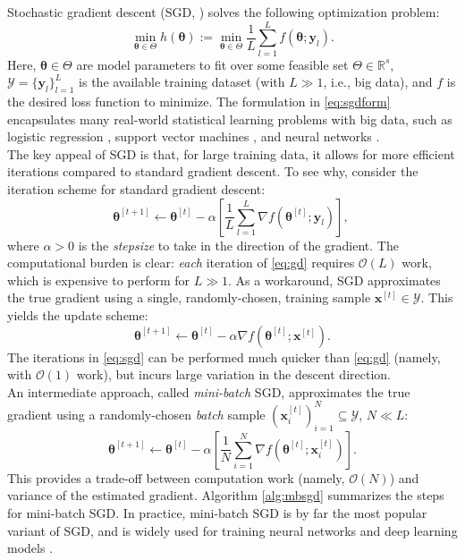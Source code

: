 \documentclass[12pt]{article}
\newcommand{\bm}[1]{\mathbf{#1}}
\begin{document}
Stochastic gradient descent (SGD, \citealp{Bot2010}) solves the following optimization problem:
\begin{equation}
\min_{\boldsymbol{\theta} \in \Theta} h(\boldsymbol{\theta}) := \min_{\boldsymbol{\theta} \in \Theta} \frac{1}{L} \sum_{l=1}^L f(\boldsymbol{\theta}; \bm{y}_l).
\label{eq:sgdform}
\end{equation}
Here, $\boldsymbol{\theta} \in \Theta$ are model parameters to fit over some feasible set $\Theta \in \mathbb{R}^s$, $\mathcal{Y} = \{\bm{y}_l\}_{l=1}^L$ is the available training dataset (with $L \gg 1$, i.e., big data), and $f$ is the desired loss function to minimize. The formulation in \eqref{eq:sgdform} encapsulates many real-world statistical learning problems with big data, such as logistic regression \citep{Bac2014}, support vector machines \citep{Tan2013}, and neural networks \citep{Sea2014}.\\

The key appeal of SGD is that, for large training data, it allows for more efficient iterations compared to standard gradient descent. To see why, consider the iteration scheme for standard gradient descent:
\begin{equation}
\boldsymbol{\theta}^{[t+1]} \leftarrow \boldsymbol{\theta}^{[t]} - \alpha \left[ \frac{1}{L} \sum_{l=1}^L \nabla f(\boldsymbol{\theta}^{[t]}; \bm{y}_l) \right],\
\label{eq:gd}
\end{equation}
where $\alpha > 0$ is the \textit{stepsize} to take in the direction of the gradient. The computational burden is clear: \textit{each} iteration of \eqref{eq:gd} requires $\mathcal{O}(L)$ work, which is expensive to perform for $L \gg 1$. As a workaround, SGD approximates the true gradient using a single, randomly-chosen, training sample $\bm{x}^{[t]} \in \mathcal{Y}$. This yields the update scheme:
\begin{equation}
\boldsymbol{\theta}^{[t+1]} \leftarrow \boldsymbol{\theta}^{[t]} - \alpha \nabla f(\boldsymbol{\theta}^{[t]}; \bm{x}^{[t]}).
\label{eq:sgd}
\end{equation}
The iterations in \eqref{eq:sgd} can be performed much quicker than \eqref{eq:gd} (namely, with $\mathcal{O}(1)$ work), but incurs large variation in the descent direction.\\

An intermediate approach, called \textit{mini-batch} SGD, approximates the true gradient using a randomly-chosen \textit{batch} sample $(\bm{x}_i^{[t]})_{i=1}^N \subseteq \mathcal{Y}$, $N \ll L$:
\begin{equation}
\boldsymbol{\theta}^{[t+1]} \leftarrow \boldsymbol{\theta}^{[t]} - \alpha \left[ \frac{1}{N} \sum_{i=1}^N \nabla f(\boldsymbol{\theta}^{[t]}; \bm{x}_i^{[t]}) \right].
\label{eq:mbsgd}
\end{equation}
This provides a trade-off between computation work (namely, $\mathcal{O}(N)$) and variance of the estimated gradient. Algorithm \ref{alg:mbsgd} summarizes the steps for mini-batch SGD. In practice, mini-batch SGD is by far the most popular variant of SGD, and is widely used for training neural networks and deep learning models \citep{Sea2014}.\\
\end{document}
